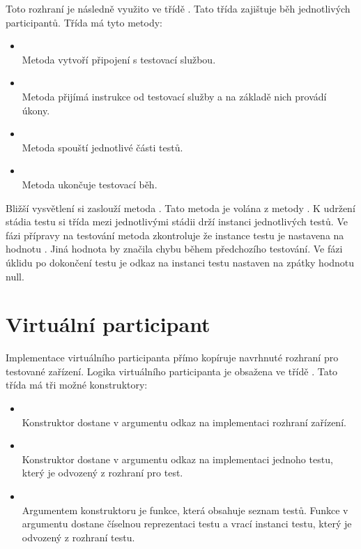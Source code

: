 Toto rozhraní je následně využito ve třídě . Tato třída zajištuje běh jednotlivých participantů. Třída má tyto metody:

\begin{itemize}
    \item {} \\ Metoda vytvoří připojení s testovací službou.
    \item {} \\ Metoda přijímá instrukce od testovací služby a na základě nich provádí úkony.
    \item {} \\ Metoda spouští jednotlivé části testů. 
    \item {} \\ Metoda ukončuje testovací běh.
\end{itemize}

Bližší vysvětlení si zaslouží metoda . Tato metoda je volána z metody . K udržení stádia testu si třída mezi jednotlivými stádii drží instanci jednotlivých testů. Ve fázi přípravy na testování metoda zkontroluje že instance testu je nastavena na hodnotu . Jiná hodnota by značila chybu během předchozího testování. Ve fázi úklidu po dokončení testu je odkaz na instanci testu nastaven na zpátky hodnotu null.

\section{Virtuální participant}
Implementace virtuálního participanta přímo kopíruje navrhnuté rozhraní pro testované zařízení. Logika virtuálního participanta je obsažena ve třídě . Tato třída má tři možné konstruktory:

\begin{itemize} 
    \item {} \\
    Konstruktor dostane v argumentu odkaz na implementaci rozhraní zařízení.
    \item {} \\
    Konstruktor dostane v argumentu odkaz na implementaci jednoho testu, který je odvozený z rozhraní pro test.
    \item {} \\
    Argumentem konstruktoru je funkce, která obsahuje seznam testů. Funkce v argumentu dostane číselnou reprezentaci testu a vrací instanci testu, který je odvozený z rozhraní testu.
\end{itemize}

